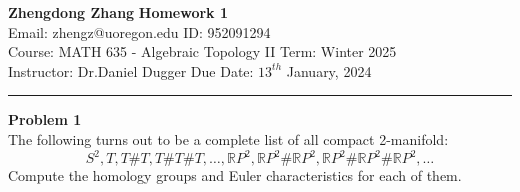 \documentclass[a4paper, 12pt]{article}
\newenvironment{problem}[2][Problem]
    { \begin{mdframed}[backgroundcolor=gray!20] \textbf{#1 #2} \\}
    {  \end{mdframed}}
\begin{document}
\noindent
\large\textbf{Zhengdong Zhang} \hfill \textbf{Homework 1}   \\
Email: zhengz@uoregon.edu \hfill ID: 952091294 \\
\normalsize Course: MATH 635 - Algebraic Topology II \hfill Term: Winter 2025\\
Instructor: Dr.Daniel Dugger \hfill Due Date: $13^{th}$ January, 2024 \\
\noindent\rule{7in}{2.8pt}
\begin{problem}{1}
The following turns out to be a complete list of all compact 2-manifold:
\[S^2,T,T\# T,T\#T\#T,\ldots, \mathbb{R}P^2, \mathbb{R}P^2\#\mathbb{R}P^2,\mathbb{R}P^2\#\mathbb{R}P^2\#\mathbb{R}P^2,\ldots\]
Compute the homology groups and Euler characteristics for each of them.
\end{problem}
\end{document}
